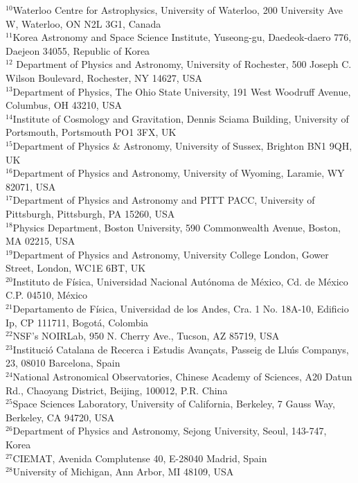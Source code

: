 {$^{10}$Waterloo Centre for Astrophysics, University of Waterloo, 200 University Ave W, Waterloo, ON N2L 3G1, Canada\\
$^{11}$Korea Astronomy and Space Science Institute, Yuseong-gu, Daedeok-daero 776, Daejeon 34055, Republic of Korea\\
$^{12}$ Department of Physics and Astronomy, University of Rochester, 500 Joseph C. Wilson Boulevard, Rochester, NY 14627, USA \\
$^{13}$Department of Physics, The Ohio State University, 191 West Woodruff Avenue, Columbus, OH 43210, USA\\
$^{14}$Institute of Cosmology and Gravitation, Dennis Sciama Building, University of Portsmouth, Portsmouth PO1 3FX, UK \\
$^{15}$Department of Physics \& Astronomy, University of Sussex, Brighton BN1 9QH, UK\\
$^{16}$Department of Physics and Astronomy, University of Wyoming, Laramie, WY 82071, USA\\
$^{17}$Department of Physics and Astronomy and PITT PACC, University of Pittsburgh, Pittsburgh, PA 15260, USA\\
$^{18}$Physics Department, Boston University, 590 Commonwealth Avenue, Boston, MA 02215,
USA\\
$^{19}$Department of Physics and Astronomy, University College London, Gower Street, London,
WC1E 6BT, UK\\
$^{20}$Instituto de Física, Universidad Nacional Autónoma de México, Cd. de México C.P. 04510,
México\\
$^{21}$Departamento de F\'isica, Universidad de los Andes, Cra. 1 No. 18A-10, Edificio Ip, CP 111711, Bogot\'a, Colombia\\
$^{22}$NSF's NOIRLab, 950 N. Cherry Ave., Tucson, AZ 85719, USA\\
$^{23}$Instituci\'{o} Catalana de Recerca i Estudis Avan\c{c}ats, Passeig de Llu\'{\i}s Companys, 23, 08010 Barcelona, Spain\\
$^{24}$National Astronomical Observatories, Chinese Academy of Sciences, A20 Datun Rd., Chaoyang District, Beijing, 100012, P.R. China\\
$^{25}$Space Sciences Laboratory, University of California, Berkeley, 7 Gauss Way, Berkeley, CA 94720, USA\\
$^{26}$Department of Physics and Astronomy, Sejong University, Seoul, 143-747, Korea\\
$^{27}$CIEMAT, Avenida Complutense 40, E-28040 Madrid, Spain\\
$^{28}$University of Michigan, Ann Arbor, MI 48109, USA
}
